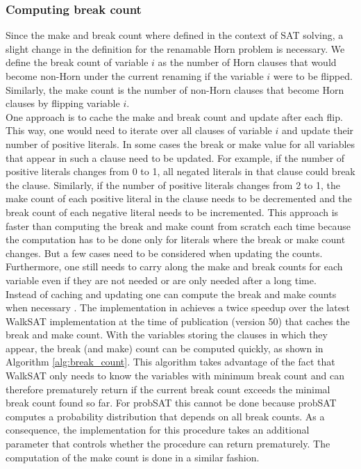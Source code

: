 \documentclass[12pt,a4paper]{article}
\begin{document}
\subsubsection{Computing break count}
Since the make and break count where defined in the context of SAT solving, a slight change in the definition for the renamable Horn problem is necessary. We define the break count of variable $i$ as the number of Horn clauses that would become non-Horn under the current renaming if the variable $i$ were to be flipped. \\
Similarly, the make count is the number of non-Horn clauses that become Horn clauses by flipping variable $i$.\\

One approach is to cache the make and break count and update after each flip. This way, one would need to iterate over all clauses of variable $i$ and update their number of positive literals. In some cases the break or make value for all variables that appear in such a clause need to be updated. For example, if the number of positive literals changes from 0 to 1, all negated literals in that clause could break the clause. Similarly, if the number of positive literals changes from 2 to 1, the make count of each positive literal in the clause needs to be decremented and the break count of each negative literal needs to be incremented. This approach is faster than computing the break and make count from scratch each time because the computation has to be done only for literals where the break or make count changes. But a few cases need to be considered when updating the counts. Furthermore, one still needs to carry along the make and break counts for each variable even if they are not needed or are only needed after a long time.\\
Instead of caching and updating one can compute the break and make counts when necessary \cite{Faster_WalkSAT}. The implementation in \cite{Faster_WalkSAT} achieves a twice speedup over the latest WalkSAT implementation at the time of publication \cite{kautz}(version 50) that caches the break and make count. With the variables storing the clauses in which they appear, the break (and make) count can be computed quickly, as shown in Algorithm \ref{alg:break_count}. This algorithm takes advantage of the fact that WalkSAT only needs to know the variables with minimum break count and can therefore prematurely return if the current break count exceeds the minimal break count found so far. For probSAT this cannot be done because probSAT computes a probability distribution that depends on all break counts. As a consequence, the implementation for this procedure takes an additional parameter that controls whether the procedure can return prematurely. The computation of the make count is done in a similar fashion.\\
\end{document}
